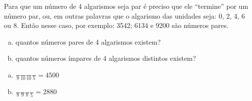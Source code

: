 \begin{ex}
Para que um número de 4 algarismos seja par é preciso que ele “termine” por um número par, ou, em outras palavras que o algarismo das unidades seja: 0, 2, 4, 6 ou 8. Então nesse caso, por exemplo: 3542; 6134 e 9200 são números pares.
   \begin{enumerate}[(a)]
   \item quantos números pares de 4 algarismos existem?
   \item quantos números ímpares de 4 algarismos distintos existem?
   \end{enumerate}
     \begin{sol}
      \phantom{A}
        \begin{enumerate} [(a)]
            \item $\frac{\phantom{A}}{9}\frac{\phantom{A}}{10}\frac{\phantom{A}}{10}\frac{\phantom{A}}{5}=4500$
            \item $\frac{\phantom{A}}{8}\frac{\phantom{A}}{9}\frac{\phantom{A}}{8}\frac{\phantom{A}}{5}=2880$
        \end{enumerate}
     \end{sol}
\end{ex}